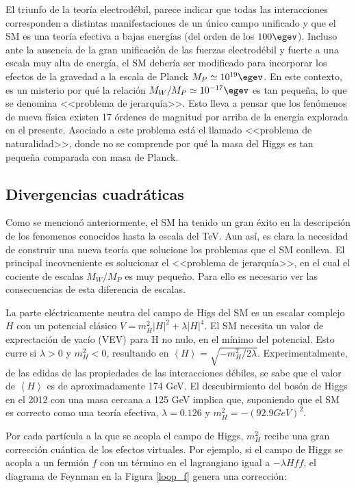 El triunfo de la teoría electrodébil, parece indicar que todas las interacciones corresponden a distintas manifestaciones de un único campo unificado y que el SM es una teoría efectiva a bajas energías (del orden de los $100\egev$). Incluso ante la ausencia de la gran unificación de las fuerzas electrodébil y fuerte a una escala muy alta de energía, el SM debería ser modificado para incorporar los efectos de la gravedad a la escala de Planck $M_{P} \simeq 10^{19} \egev$. En este contexto, es un misterio por qué la relación $M_{W}/M_{P} \simeq 10^{-17} \egev$ es tan pequeña, lo que se denomina <<problema de jerarquía>>\cite{PhysRevD.14.1667}. Esto lleva a pensar que los fenómenos de nueva física existen 17 órdenes de magnitud por arriba de la energía explorada en el presente. Asociado a este problema está el llamado <<problema de naturalidad>>, donde no se comprende por qué la masa del Higgs es tan pequeña comparada con masa de Planck.


\subsection{Divergencias cuadráticas}

Como se mencionó anteriormente, el SM ha tenido un gran éxito en la descripción de los fenomenos conocidos hasta la escala del TeV. Aun así, es clara la necesidad de construir una nueva teoría que solucione los problemas que el SM conlleva. El principal incovneniente es solucionar el <<problema de jerarquía>>, en el cual el cociente de escalas $M_{W}/M_{P}$ es muy pequeño. Para ello es necesario ver las consecuencias de esta diferencia de escalas.

La parte eléctricamente neutra del campo de Higs del SM es un escalar complejo $H$ con un potencial clásico $V=m_{H}^{2}|H|^{2}+\lambda|H|^{4}$. El SM necesita un valor de exprectación de vacío (VEV) para H no nulo, en el mínimo del potencial. Esto curre si $\lambda >0$ y $m_{H}^{2}<0$, resultando en $\left\langle H \right\rangle = \sqrt{-m_{H}^{2}/2\lambda}$. Experimentalmente, de las edidas de las propiedades de las interacciones débiles, se sabe que el valor de $\left\langle H \right\rangle$ es de aproximadamente 174 GeV. El descubirmiento del bosón de Higgs en el 2012 con una masa cercana a 125 GeV implica que, suponiendo que el SM es correcto como una teoría efectiva, $\lambda = 0.126$ y $m_{H}^{2}=-(92.9 GeV)^{2}$.

Por cada partícula a la que se acopla el campo de Higgs, $m_{H}^{2}$ recibe una gran corrección cuántica de los efectos virtuales. Por ejemplo, si el campo de Higgs se acopla a un fermión $f$ con un término en el lagrangiano igual a $-\lambda H\hat{f}f$, el diagrama de Feynman en la Figura \ref{loop_f} genera una corrección:

